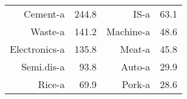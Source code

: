 \begin{tabular}{rrrr}
Cement-a & 244.8 & IS-a  & 63.1 \\
Waste-a & 141.2 & Machine-a & 48.6 \\
Electronics-a & 135.8 & Meat-a & 45.8 \\
Semi.dis-a & 93.8  & Auto-a & 29.9 \\
Rice-a & 69.9  & Pork-a & 28.6 \\
\end{tabular}%
